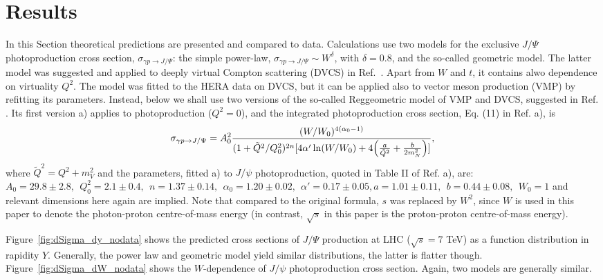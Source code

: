 \documentclass[12pt]{article}
\begin{document}
\section{Results}

In this Section theoretical predictions are presented and compared to data.
Calculations use two models for the exclusive $J/\Psi$ photoproduction cross section, $\sigma_{\gamma p \to J/\Psi}$:
the simple power-law, $\sigma_{\gamma p \to J/\Psi}\sim W^\delta$, with $\delta=0.8$, and the so-called geometric model.
The latter model was suggested and applied to deeply virtual Compton scattering (DVCS) in Ref.~\cite{Capua}.
Apart from $W$ and $t$, it contains alwo dependence on virtuality $Q^2$.
The model was fitted to the HERA data on DVCS, but it can be applied also to vector meson production (VMP) by refitting its parameters.
Instead, below we shall use two versions of the so-called Reggeometric model of VMP and DVCS, suggested in Ref. \cite{FFJS}.
Its first version \cite{FFJS} a) applies to photoproduction ($Q^2=0$), and the integrated photoproduction cross section, Eq. (11) in Ref. \cite{FFJS} a), is
\begin{equation}
\sigma_{\gamma p \to J/\Psi}=A_0^2\frac{(W/W_0)^{4(\alpha_0-1)}}{(1+\tilde Q^2/Q^2_0)^{2n}[4\alpha'\ln(W/W_0)+4\Bigl(\frac{a}{\tilde Q^2}+\frac{b}{2m_N^2}\Bigr)]},
\end{equation}
where $\tilde Q^2=Q^2+m_V^2$ and the parameters, fitted \cite{FFJS} a) to $J/\psi$ photoproduction, quoted in
Table II of Ref. \cite{FFJS} a), are: $A_0=29.8\pm 2.8,\ \ Q_0^2=2.1\pm 0.4,\ \
n=1.37\pm 0.14,\ \ \alpha_0 =1.20\pm 0.02,\ \ \alpha'=0.17\pm 0.05, a=1.01\pm 0.11,\ \ b=0.44\pm 0.08,\ \ W_0=1$ and relevant dimensions here again are implied.
Note that compared to the original formula, $s$ was replaced by $W^2$, since $W$ is used in this paper to 
denote the photon-proton centre-of-mass energy (in contrast, $\sqrt{s}$ in this paper is the proton-proton centre-of-mass energy).

Figure~\ref{fig:dSigma_dy_nodata} shows the predicted cross sections of $J/\Psi$ production at LHC ($\sqrt{s}=7$ TeV) as a function distribution in rapidity $Y$.
Generally, the power law and geometric model yield similar distributions,  the latter is flatter though.
Figure~\ref{fig:dSigma_dW_nodata} shows the $W$-dependence of $J/\psi$ photoproduction cross section.
Again, two models are generally similar.
\newpage
\end{document}
